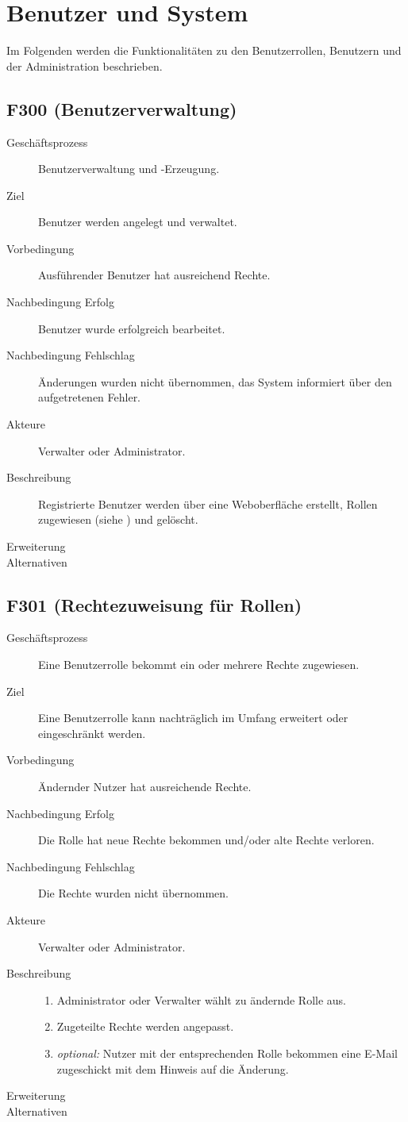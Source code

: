 \section{Benutzer und System}
Im Folgenden werden die Funktionalitäten zu den Benutzerrollen, Benutzern und der Administration beschrieben.

\subsection{F300 (Benutzerverwaltung)}
\begin{description}
  \item[Geschäftsprozess]Benutzerverwaltung und -Erzeugung.
  \item[Ziel]Benutzer werden angelegt und verwaltet.
  \item[Vorbedingung]Ausführender Benutzer hat ausreichend Rechte.
  \item[Nachbedingung Erfolg]Benutzer wurde erfolgreich bearbeitet.
  \item[Nachbedingung Fehlschlag]Änderungen wurden nicht übernommen, das System informiert über den aufgetretenen Fehler.
  \item[Akteure]Verwalter oder Administrator.
  \item[Beschreibung]Registrierte Benutzer werden über eine Weboberfläche erstellt, Rollen zugewiesen (siehe ) und gelöscht.
  \item[Erweiterung]
  \item[Alternativen]
\end{description}

\subsection{F301 (Rechtezuweisung für Rollen)} 
\begin{description}
  \item[Geschäftsprozess]Eine Benutzerrolle bekommt ein oder mehrere Rechte zugewiesen.
  \item[Ziel]Eine Benutzerrolle kann nachträglich im Umfang erweitert oder eingeschränkt werden.
  \item[Vorbedingung]Ändernder Nutzer hat ausreichende Rechte.
  \item[Nachbedingung Erfolg]Die Rolle hat neue Rechte bekommen und/oder alte Rechte verloren.
  \item[Nachbedingung Fehlschlag]Die Rechte wurden nicht übernommen.
  \item[Akteure]Verwalter oder Administrator.
  \item[Beschreibung]\hfill
  \begin{enumerate}
  \item Administrator oder Verwalter wählt zu ändernde Rolle aus.
  \item Zugeteilte Rechte werden angepasst.
  \item \emph{optional:} Nutzer mit der entsprechenden Rolle bekommen eine E-Mail zugeschickt mit dem Hinweis auf die Änderung.
  \end{enumerate}
  \item[Erweiterung]
  \item[Alternativen]
\end{description}

